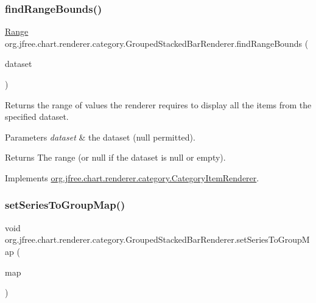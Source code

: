 \subsubsection{\texorpdfstring{find\+Range\+Bounds()}{findRangeBounds()}}
{\footnotesize\ttfamily \mbox{\hyperlink{classorg_1_1jfree_1_1data_1_1_range}{Range}} org.\+jfree.\+chart.\+renderer.\+category.\+Grouped\+Stacked\+Bar\+Renderer.\+find\+Range\+Bounds (\begin{DoxyParamCaption}\item[{\mbox{\hyperlink{interfaceorg_1_1jfree_1_1data_1_1category_1_1_category_dataset}{Category\+Dataset}}}]{dataset }\end{DoxyParamCaption})}

Returns the range of values the renderer requires to display all the items from the specified dataset.


\begin{DoxyParams}{Parameters}
{\em dataset} & the dataset ({\ttfamily null} permitted).\\
\hline
\end{DoxyParams}
\begin{DoxyReturn}{Returns}
The range (or {\ttfamily null} if the dataset is {\ttfamily null} or empty). 
\end{DoxyReturn}


Implements \mbox{\hyperlink{interfaceorg_1_1jfree_1_1chart_1_1renderer_1_1category_1_1_category_item_renderer_aa7294c25a26ffd1725d7920a6041a785}{org.\+jfree.\+chart.\+renderer.\+category.\+Category\+Item\+Renderer}}.

\mbox{\label{classorg_1_1jfree_1_1chart_1_1renderer_1_1category_1_1_grouped_stacked_bar_renderer_a9e596a526c83ce0dac6bc64e6e2c0a78}} 
\subsubsection{\texorpdfstring{set\+Series\+To\+Group\+Map()}{setSeriesToGroupMap()}}
{\footnotesize\ttfamily void org.\+jfree.\+chart.\+renderer.\+category.\+Grouped\+Stacked\+Bar\+Renderer.\+set\+Series\+To\+Group\+Map (\begin{DoxyParamCaption}\item[{\mbox{\hyperlink{classorg_1_1jfree_1_1data_1_1_key_to_group_map}{Key\+To\+Group\+Map}}}]{map }\end{DoxyParamCaption})}

